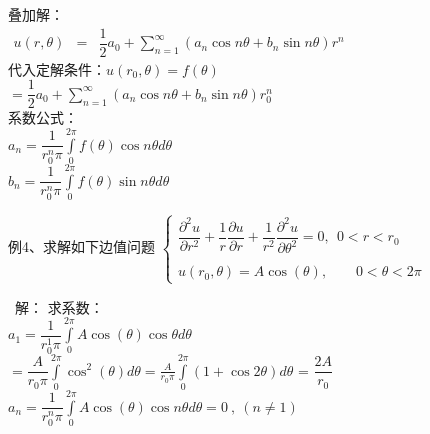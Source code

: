 \begin{frame}	
	叠加解：\\ 
	$\begin{array}{llll}
		u(r, \theta) &=& \dfrac{1}{2} a_0 +\sum\limits_{n=1}^{\infty } (a_n\cos n\theta +b_n \sin n \theta ) r^n
	\end{array}$ \\ 
	代入定解条件：$ u(r_0,\theta)=f (\theta)   $ \\ 
	$ =  \dfrac{1}{2} a_0 +\sum\limits_{n=1}^{\infty } (a_n\cos n\theta +b_n \sin n \theta ) r_0^n $\\ 
	系数公式：\\ 
	$  \displaystyle  a_n = \dfrac{1}{r_0 ^n \pi }  \int\limits_{0}^{2\pi} f(\theta) \cos n \theta d\theta $ \\ 
	$  \displaystyle  b_n = \dfrac{1}{r_0 ^n \pi }  \int\limits_{0}^{2\pi} f(\theta) \sin n \theta d\theta $  \\ 	
\end{frame}	

\begin{frame}	
	\begin{exampleblock} { 例4、求解如下边值问题}
	{ $  \displaystyle  \left \{ 
	\begin{array}{cc}
		\displaystyle {	\dfrac{\partial^2 u }{\partial r^2 } +\dfrac{1}{r } \dfrac{\partial u }{\partial r } +
		\dfrac{1}{r^2 } \dfrac{\partial ^2 u }{\partial \theta ^2
		} } =0, ~~ 0<r<r_0\\
		\\
		u(r_0,\theta )=A\cos(\theta),~~~~~~~~~ 0<\theta <2\pi 
	\end{array}
	\right. $}  
	\end{exampleblock}	
	\alert{ 解：}	 求系数：\\
	$  \displaystyle  a_1 = \dfrac{1}{r_0 ^1 \pi }  \int\limits_{0}^{2\pi} A\cos(\theta) \cos  \theta d\theta  $ \\ 	
	\hspace{0.8cm}$  \displaystyle  = \dfrac{A}{r_0  \pi }  \int\limits_{0}^{2\pi} \cos ^2 (\theta)  d\theta  = \frac{A}{r_0 \pi }  \int\limits_{0}^{2\pi} (1+\cos2\theta) d\theta$ = $\dfrac{2A}{r_0}$ \\ 
	$  \displaystyle  a_n = \dfrac{1}{r_0 ^n \pi }  \int\limits_{0}^{2\pi} A\cos(\theta) \cos n \theta d\theta =0~,~ (n\ne 1)$ \\ 
\end{frame}	

